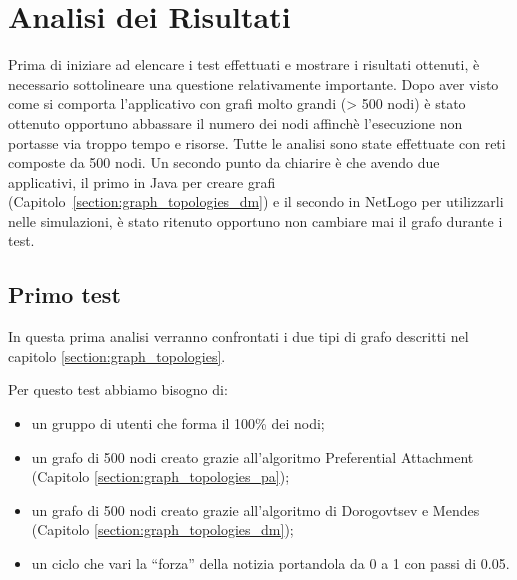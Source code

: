 \newpage
\section{Analisi dei Risultati}
\label{section:analisirisultati}

Prima di iniziare ad elencare i test effettuati e mostrare i risultati ottenuti, è
necessario sottolineare una questione relativamente importante.
Dopo aver visto come si comporta l'applicativo con grafi molto grandi (> 500 nodi) è stato ottenuto opportuno
abbassare il numero dei nodi affinchè l'esecuzione non portasse via troppo tempo e risorse.
Tutte le analisi sono state effettuate con reti composte da 500 nodi.
Un secondo punto da chiarire è che avendo due applicativi, 
il primo in Java per creare grafi (Capitolo~\ref{section:graph_topologies_dm}) e il secondo in NetLogo per utilizzarli nelle simulazioni,
è stato ritenuto opportuno non cambiare mai il grafo durante i test.


\subsection{Primo test}
\label{section:first_test}

In questa prima analisi verranno confrontati i due tipi di grafo descritti nel capitolo \ref{section:graph_topologies}.

Per questo test abbiamo bisogno di:
\begin{itemize}
\item un gruppo di utenti che forma il 100\% dei nodi;
\item un grafo di 500 nodi creato grazie all'algoritmo Preferential Attachment (Capitolo \ref{section:graph_topologies_pa});
\item un grafo di 500 nodi creato grazie all'algoritmo di Dorogovtsev e Mendes (Capitolo \ref{section:graph_topologies_dm});
\item un ciclo che vari la ``forza'' della notizia portandola da 0 a 1 con passi di 0.05.
\end{itemize}




